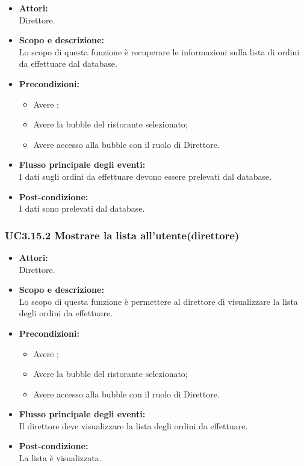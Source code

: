 \begin{itemize}
	\item \textbf{Attori:}
	\\Direttore.
	\item \textbf{Scopo e descrizione:} 
	\\Lo scopo di questa funzione è recuperare le informazioni sulla lista di ordini da effettuare dal database.
	\item \textbf{Precondizioni:}
	\begin{itemize}
		\item Avere ;
		\item Avere la bubble del ristorante selezionato;
		\item Avere accesso alla bubble con il ruolo di Direttore.
	\end{itemize}
	\item \textbf{Flusso principale degli eventi:}
	\\I dati sugli ordini da effettuare devono essere prelevati dal database.
	\item \textbf{Post-condizione:}
	\\I dati sono prelevati dal database.
\end{itemize}

\subsubsection{UC3.15.2 Mostrare la lista all’utente(direttore)} \label{UC3.15.2}

\begin{itemize}
	\item \textbf{Attori:}
	\\Direttore.
	\item \textbf{Scopo e descrizione:} 
	\\Lo scopo di questa funzione è permettere al direttore di visualizzare la lista degli ordini da effettuare.
	\item \textbf{Precondizioni:}
	\begin{itemize}
		\item Avere ;
		\item Avere la bubble del ristorante selezionato;
		\item Avere accesso alla bubble con il ruolo di Direttore.
	\end{itemize}
	\item \textbf{Flusso principale degli eventi:}
	\\Il direttore deve visualizzare la lista degli ordini da effettuare.
	\item \textbf{Post-condizione:}
	\\La lista è visualizzata.
\end{itemize}

